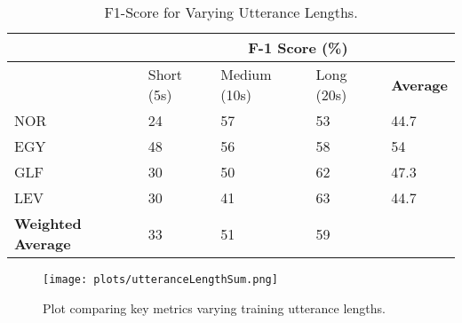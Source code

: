 \begin{table}[h!]
    \centering
    \caption{F1-Score for Varying Utterance Lengths.}\label{tab:f1utter}
    \begin{tabular}{|l|l|l|l|l|} 
    \hline
                     & \multicolumn{4}{c|}{\textbf{F-1 Score (\%)}}               \\ 
    \hline
                     & Short (5s) & Medium (10s) & Long (20s) & \textbf{Average}  \\ 
    \hline
    NOR              & 24         & 57           & 53         & 44.7              \\ 
    \hline
    EGY              & 48         & 56           & 58         & 54                \\ 
    \hline
    GLF              & 30         & 50           & 62         & 47.3              \\ 
    \hline
    LEV              & 30         & 41           & 63         & 44.7              \\ 
    \hline
    \textbf{Weighted Average} & 33         & 51           & 59         &                   \\
    \hline
    \end{tabular}
    \end{table}


    \begin{figure}[h!]
        \centering
        \texttt{[image: plots/utteranceLengthSum.png]}
        \caption{Plot comparing key metrics varying training utterance lengths.}
        \label{fig:uttsum}
    \end{figure}

    \begin{figure}[h!]
    \end{figure}
\pagebreak 
